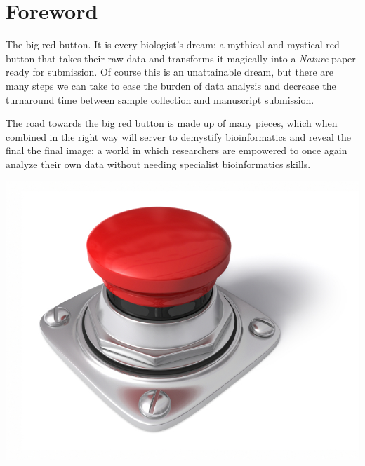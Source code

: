 \chapter*{Foreword}
{}
\setlength\parindent{0pt}
\vspace{-1cm}
The big red button. It is every biologist's dream; a mythical and mystical red button that takes their raw data and transforms it magically into a \emph{Nature} paper ready for submission. Of course this is an unattainable dream, but there are many steps we can take to ease the burden of data analysis and decrease the
turnaround time between sample collection and manuscript submission.

The road towards the big red button is made up of many pieces, which when combined in the right way will server to demystify bioinformatics and reveal the final the final image; a world in which researchers are empowered to once again analyze their own data without needing specialist bioinformatics skills.


\begin{center}
\includegraphics[scale=0.25]{chapters/images/redbutton.jpg}
\end{center}

